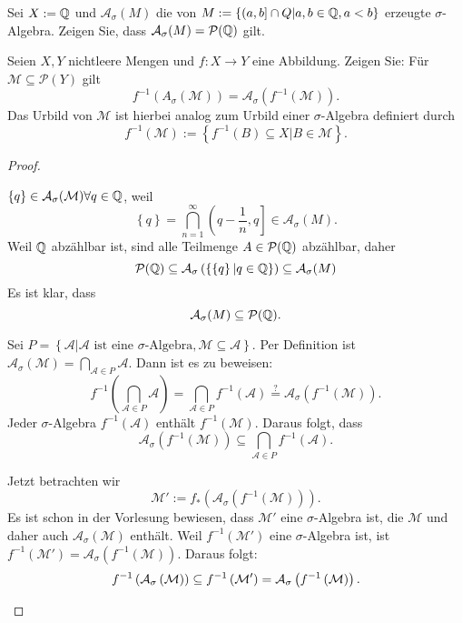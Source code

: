 \begin{Problem}
	\begin{parts}
		
	\item Sei $X := \mathbb{Q}$ und $\mathcal A_\sigma (M)$ die von $M := \{(a, b] \cap Q | a, b \in \mathbb{Q}, a < b\}$ erzeugte $\sigma$-Algebra. Zeigen Sie, dass $\mathcal A_\sigma (M ) = \mathcal{P}(\mathbb{Q})$ gilt.

 \item Seien $X, Y$ nichtleere Mengen und $f:X\to Y$ eine Abbildung. Zeigen Sie: F\"{u}r $\mathcal M\subseteq \mathcal{P}(Y)$ gilt
	 \[
		 f^{-1}\left( A_\sigma(\mathcal M) \right) =\mathcal A_\sigma\left( f^{-1}(\mathcal M) \right) 
	 .\]
	 Das Urbild von $\mathcal M$ ist hierbei analog zum Urbild einer $\sigma$-Algebra definiert durch
	 \[
		 f^{-1}(\mathcal M):=\left\{ f^{-1}(B)\subseteq X|B\in \mathcal M \right\} 
	 .\] 
	\end{parts}
\end{Problem}

\begin{proof}
	\begin{parts}
	\item $\left\{ q \right\} \in \mathcal A_\sigma(\mathcal M)\forall q\in \mathbb{Q}$, weil
		\[
			\left\{ q \right\} =\bigcap_{n=1}^\infty \left(q-\frac{1}{n}, q\right]\in \mathcal A_\sigma(M) 
		.\] 
		Weil $\mathbb{Q}$ abz\"{a}hlbar ist, sind alle Teilmenge $A\in \mathcal P(\mathbb{Q})$ abz\"{a}hlbar, daher 
		\[
		\mathcal P(\mathbb{Q})\subseteq \mathcal A_\sigma\left( \left\{ \left\{ q \right\} | q\in \mathbb{Q} \right\}  \right) \subseteq \mathcal A_\sigma(M)
	\]
		Es ist klar, dass
		\[
		\mathcal A_\sigma(M)\subseteq \mathcal P(\mathbb{Q})
		.\]
	\item 
	
		Sei $ P=\left\{ \mathcal A| \mathcal A\text{ ist eine }\sigma\text{-Algebra},\mathcal M \subseteq \mathcal A \right\} $. Per Definition ist $\mathcal A_\sigma(\mathcal M)=\bigcap_{\mathcal A\in P} \mathcal A$. Dann ist es zu beweisen: 
		\[
			f^{-1}\left( \bigcap_{\mathcal A\in P} \mathcal A \right) =\bigcap_{\mathcal A\in P} f^{-1}(\mathcal A)\overset{?}{=}\mathcal A_\sigma\left( f^{-1}\left( \mathcal M \right)  \right) 
		.\]
		Jeder $\sigma$-Algebra $f^{-1}\left( \mathcal A \right) $ enthält $f^{-1}\left( \mathcal M \right) $. Daraus folgt, dass
		\[
			\mathcal A_\sigma \left( f^{-1}\left( \mathcal M \right)  \right) \subseteq \bigcap_{\mathcal A\in P} f^{-1}(\mathcal A)
		.\] 

	Jetzt betrachten wir
	\[
		\mathcal{M}':=f_*\left( \mathcal{A}_\sigma \left( f^{-1}(\mathcal{M}) \right)  \right) 
	.\]
	Es ist schon in der Vorlesung bewiesen, dass $\mathcal{M}'$ eine $\sigma$-Algebra ist, die $\mathcal{M}$ und daher auch $\mathcal{A}_\sigma \left( \mathcal{M} \right) $ enth\"{a}lt. Weil $f^{-1}(\mathcal{M}')$ eine $\sigma$-Algebra ist, ist $f^{-1}\left( \mathcal{M}' \right)=\mathcal{A}_\sigma\left( f^{-1}\left( \mathcal{M} \right)  \right)  $. Daraus folgt:
	\[
		f^{-1}\left( \mathcal{A}_\sigma \left( \mathcal{M} \right)  \right) \subseteq f^{-1}\left( \mathcal{ M}' \right) =\mathcal{A}_\sigma\left( f^{-1}\left( \mathcal{ M} \right)  \right) . \qedhere\]
	\end{parts}
\end{proof}

